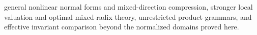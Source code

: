 \begin{resultbox}
general nonlinear normal forms and mixed-direction compression, stronger local valuation and optimal mixed-radix theory, unrestricted product grammars, and effective invariant comparison beyond the normalized domains proved here.
\end{resultbox}
